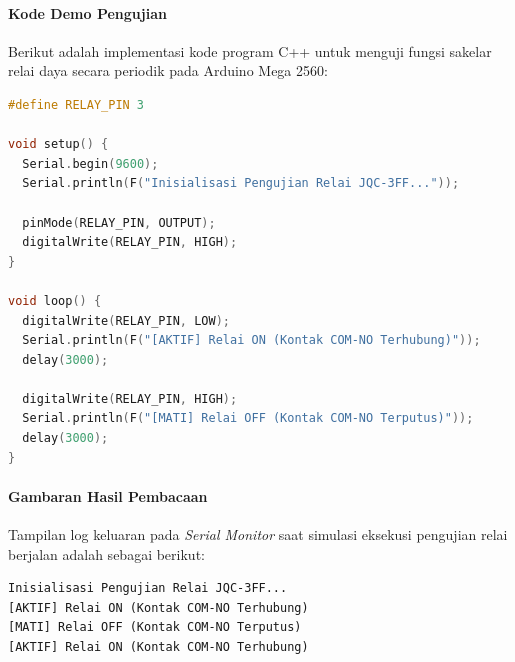 \paragraph{Kode Demo Pengujian}
Berikut adalah implementasi kode program C++ untuk menguji fungsi sakelar relai daya secara periodik pada Arduino Mega 2560:

\begin{lstlisting}[language=C++, caption={Kode program pengujian sakelar relai JQC-3FF-S-Z pada Arduino Mega 2560}, label={lst:jqc3ff_code}]
#define RELAY_PIN 3

void setup() {
  Serial.begin(9600);
  Serial.println(F("Inisialisasi Pengujian Relai JQC-3FF..."));

  pinMode(RELAY_PIN, OUTPUT);
  digitalWrite(RELAY_PIN, HIGH);
}

void loop() {
  digitalWrite(RELAY_PIN, LOW);
  Serial.println(F("[AKTIF] Relai ON (Kontak COM-NO Terhubung)"));
  delay(3000);

  digitalWrite(RELAY_PIN, HIGH);
  Serial.println(F("[MATI] Relai OFF (Kontak COM-NO Terputus)"));
  delay(3000);
}
\end{lstlisting}

\paragraph{Gambaran Hasil Pembacaan}
Tampilan log keluaran pada \textit{Serial Monitor} saat simulasi eksekusi pengujian relai berjalan adalah sebagai berikut:

\begin{verbatim}
Inisialisasi Pengujian Relai JQC-3FF...
[AKTIF] Relai ON (Kontak COM-NO Terhubung)
[MATI] Relai OFF (Kontak COM-NO Terputus)
[AKTIF] Relai ON (Kontak COM-NO Terhubung)
\end{verbatim}
